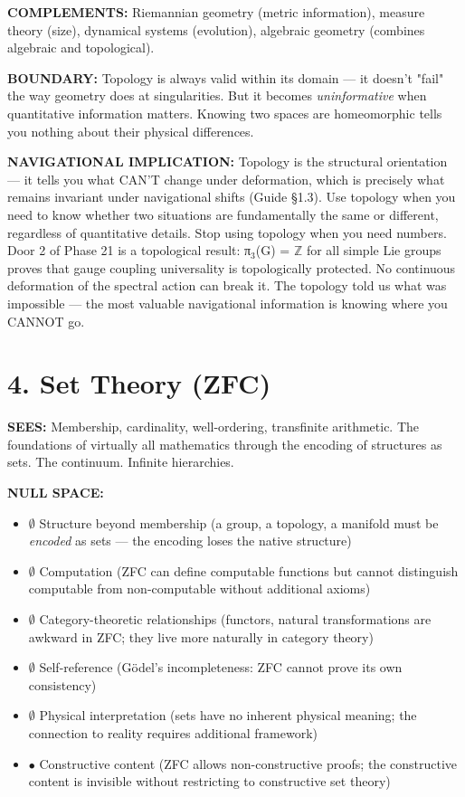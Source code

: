 \textbf{COMPLEMENTS:} Riemannian geometry (metric information), measure theory (size), dynamical systems (evolution), algebraic geometry (combines algebraic and topological).


\textbf{BOUNDARY:} Topology is always valid within its domain — it doesn't "fail" the way geometry does at singularities. But it becomes \textit{uninformative} when quantitative information matters. Knowing two spaces are homeomorphic tells you nothing about their physical differences.


\textbf{NAVIGATIONAL IMPLICATION:} Topology is the structural orientation — it tells you what CAN'T change under deformation, which is precisely what remains invariant under navigational shifts (Guide §1.3). Use topology when you need to know whether two situations are fundamentally the same or different, regardless of quantitative details. Stop using topology when you need numbers. Door 2 of Phase 21 is a topological result: π$_3$(G) = $\mathbb{Z}$ for all simple Lie groups proves that gauge coupling universality is topologically protected. No continuous deformation of the spectral action can break it. The topology told us what was impossible — the most valuable navigational information is knowing where you CANNOT go.


\bigskip\noindent\makebox[\textwidth]{\color{rulegray}\rule{5cm}{0.3pt}}\bigskip


\section*{4. Set Theory (ZFC)}


\textbf{SEES:} Membership, cardinality, well-ordering, transfinite arithmetic. The foundations of virtually all mathematics through the encoding of structures as sets. The continuum. Infinite hierarchies.


\textbf{NULL SPACE:}

\begin{itemize}[nosep,leftmargin=*]
  \item $\emptyset$ Structure beyond membership (a group, a topology, a manifold must be \textit{encoded} as sets — the encoding loses the native structure)
  \item $\emptyset$ Computation (ZFC can define computable functions but cannot distinguish computable from non-computable without additional axioms)
  \item $\emptyset$ Category-theoretic relationships (functors, natural transformations are awkward in ZFC; they live more naturally in category theory)
  \item $\emptyset$ Self-reference (Gödel's incompleteness: ZFC cannot prove its own consistency)
  \item $\emptyset$ Physical interpretation (sets have no inherent physical meaning; the connection to reality requires additional framework)
  \item $\bullet$ Constructive content (ZFC allows non-constructive proofs; the constructive content is invisible without restricting to constructive set theory)
\end{itemize}


